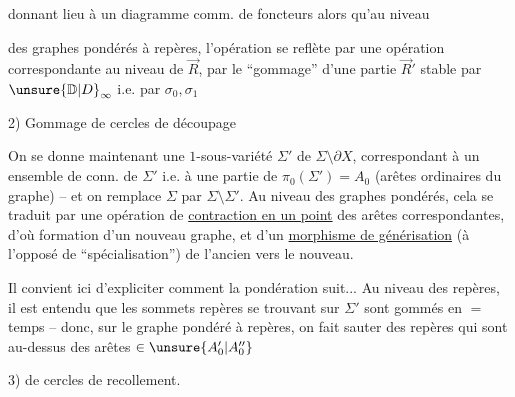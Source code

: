  donnant lieu à un diagramme comm. de foncteurs
alors qu'au niveau

des graphes pondérés à repères, l'opération  se reflète par une opération correspondante au niveau de $\vec R$, par le ``gommage'' d'une partie $\vec R'$ stable par $\unsure{\mathbb D|D}_\infty$ i.e. par $\sigma_0,\sigma_1$

2) Gommage de cercles de découpage

On se donne maintenant une  $1$-sous-variété  $\Sigma'$ de $\Sigma\setminus\partial X$, correspondant à un ensemble  de  conn. de $\Sigma'$ i.e. à une partie  de $\pi_0(\Sigma')=A_0$ (arêtes ordinaires du graphe) -- et on remplace $\Sigma$ par $\Sigma\setminus\Sigma'$. Au niveau des graphes pondérés, cela se traduit par une opération de \uline{contraction en un point} des arêtes correspondantes, d'où formation d'un nouveau graphe, et d'un \uline{morphisme de générisation} (à l'opposé de ``spécialisation'') de l'ancien vers le nouveau.

Il convient ici d'expliciter comment la pondération suit... Au niveau des repères, il est entendu que les sommets repères se trouvant sur $\Sigma'$ sont gommés en $=$ temps -- donc, sur le graphe pondéré à repères, on fait sauter  des repères qui sont au-dessus des arêtes $\in \unsure{A'_0|A''_0}$

3)  de cercles de recollement.

